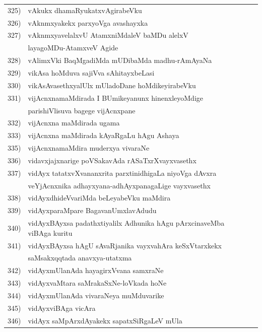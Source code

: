 {\begin{longtable}{@{}cp{7.4cm}r}
325) & vAkukx dhamaRyukatxvAgirabeVku & \pageref{page110}\\
326) & vAknmxyakekx parxyoVga avashayxka & \pageref{page110}\\
327) & vAknmxyavelalxvU AtamxniMdaleV baMDu alelxV  & \\
     & layagoMDu-AtamxveV Agide & \pageref{page195}\\
328) & vAlimxVki BaqMgadiMda mUDibaMda madhu-rAmAyaNa & \pageref{page238}\\
329)  & vikAsa hoMduva sajiVva sAhitayxbeLasi & \pageref{page79}\\ 
330) & vikAsAvasethxyalUlx mUladoDane hoMdikeyirabeVku & \pageref{page178}\\
331) & vijAcnxnamaMdirada I BUmikeyanunx hinenxleyoMdige  & \\
     & parishiVlisuva bagege vijAcnxpane & \pageref{page29}\\
332) & vijAcnxna maMdirada ugama & \pageref{page65}\\
333) & vijAcnxna maMdirada kAyaRgaLu hAgu Ashaya & \pageref{page22}\\ 
335) & vijAcnxnamaMdira muderxya vivaraNe & \pageref{page71}\\ 
336) & vidavxjajxnarige poVSakavAda rASaTxrXvayxvasethx & \pageref{page46}\\
337) & vidAyx tatatxvXvananxrita parxtinidhigaLa niyoVga dAvxra & \\
     & veYjAcnxnika adhayxyana-adhAyxpanagaLige vayxvasethx & \pageref{page55}\\
338) & vidAyxdhideVvariMda beLeyabeVku maMdira & \pageref{page66}\\
339) & vidAyxparaMpare BagavanUmxlavAdudu & \pageref{page70}\\
340) & vidAyxBAyxsa padathxtiyalilx Adhunika hAgu pArxcinaveMba viBAga kuritu & \pageref{page38}\\
341) & vidAyxBAyxsa hAgU sAvaRjanika vayxvahAra keSxVtarxkekx & \\
     & saMsakxqqtada anavxya-utatxma & \pageref{page36}\\ 
342) & vidAyxmUlanAda hayagirxVvana samxraNe & \pageref{page19}\\
343) & vidAyxvaMtara saMrakaSxNe-loVkada hoNe & \pageref{page50}\\
344) & vidAyxmUlanAda vivaraNeya muMduvarike & \pageref{page90}\\
345) & vidAyxviBAga vicAra & \pageref{page89}\\ 
346) & vidAyx saMpArxdAyakekx sapatxSiRgaLeV mUla & \pageref{page88}\\

\end{longtable}}
